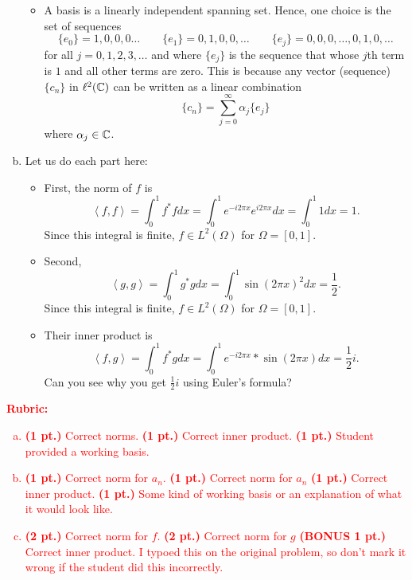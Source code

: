 \documentclass[12pt]{article} %
\newcommand{\innprod}[2]{\left\langle #1, #2\right\rangle}
\begin{document}
\begin{solution}
\begin{enumerate}[(a)]
\begin{itemize}
\item A basis is a linearly independent spanning set. Hence, one choice is the set of sequences
\[
\{e_0\} = 1,0,0,0\dots \qquad \{e_1\} = 0,1,0,0,\dots \qquad \{e_j\} = 0,0,0,\dots,0,1,0,\dots
\]
for all $j=0,1,2,3,\dots$ and where $\{e_j\}$ is the sequence that whose $j$th term is $1$ and all other terms are zero. 
This is because any vector (sequence) $\{c_n\}$ in $\ell^2(\mathbb{C})$ can be written as a linear combination
\[
\{c_n\} = \sum_{j=0}^\infty \alpha_j \{e_j\}
\]
where $\alpha_j \in \mathbb{C}$.
\end{itemize}

\item Let us do each part here:
\begin{itemize}
\item First, the norm of $f$ is
\[
		\innprod{f}{f} = \int_0^1 f^* f dx = \int_0^1 e^{-i2\pi x} e^{i2\pi x} dx = \int_0^1 1 dx = 1.
\]
Since this integral is finite, $f\in L^2(\Omega)$ for $\Omega = [0,1]$.
\item Second, 
\[
			\innprod{g}{g} = \int_0^1 g^* g dx = \int_0^1 \sin(2\pi x)^2 dx =  \frac{1}{2}.
\]
Since this integral is finite, $f\in L^2(\Omega)$ for $\Omega = [0,1]$.
\item Their inner product is
\[
		\innprod{f}{g} = \int_0^1 f^* g dx = \int_0^1 e^{-i2\pi x}*\sin(2\pi x) dx =  \frac{1}{2}i.
\]
Can you see why you get $\frac{1}{2} i$ using Euler's formula?
\end{itemize}
\end{enumerate}
\end{solution}
\vspace*{1cm}
\textcolor{red}{
\noindent \textbf{Rubric:}
\begin{enumerate}[(a)]
    \item \textbf{(1 pt.)} Correct norms. \textbf{(1 pt.)} Correct inner product. \textbf{(1 pt.)} Student provided a working basis.
    \item \textbf{(1 pt.)} Correct norm for $a_n$. \textbf{(1 pt.)} Correct norm for $a_n$ \textbf{(1 pt.)} Correct inner product. \textbf{(1 pt.)} Some kind of working basis or an explanation of what it would look like.
    \item \textbf{(2 pt.)} Correct norm for $f$. \textbf{(2 pt.)} Correct norm for $g$ \textbf{(BONUS 1 pt.)} Correct inner product. I typoed this on the original problem, so don't mark it wrong if the student did this incorrectly.
\end{enumerate}
}
\end{document}
